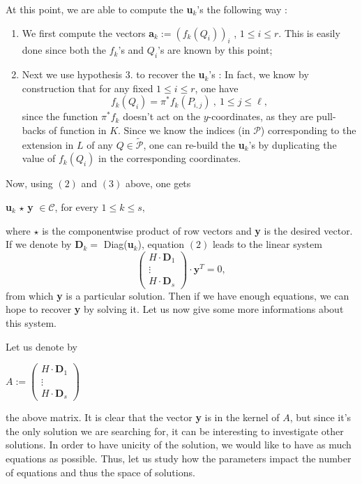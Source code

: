 \documentclass[10pt]{article}
\newcommand{\s}{\vspace{0.3cm}}
\newcommand{\cd}{\cdot}
\newcommand{\PR}{\mathcal{P}}
\begin{document}
At this point, we are able to compute the \textbf{u}$_{k}$'s the following way :
\begin{enumerate}
\item We first compute the vectors \textbf{a}$_{k} := (f_k(Q_i))_i$ , $1 \leq i \leq r$. This is easily done since both the $f_k$'s and $Q_i$'s are known by this point;
\item Next we use hypothesis $3.$ to recover the \textbf{u}$_{k}$'s : In fact, we know by construction that for any fixed $1 \leq i \leq r$, one have 
\[f_k(Q_i) = \pi^*f_k(P_{i,j}) \ , \ 1 \leq j \leq \ell,\]
since the function $\pi^*f_k$ doesn't act on the $y$-coordinates, as they are pull-backs of function in $K$. Since we know the indices (in $\PR$) corresponding to the extension in $L$ of any $Q \in \tilde{\PR}$, one can re-build the \textbf{u}$_{k}$'s by duplicating the value of $f_k(Q_i)$ in the corresponding coordinates.
\end{enumerate}

Now, using $(2)$ and $(3)$ above, one gets 
\begin{center}
\textbf{u}$_{k}$ $\star$ \textbf{y} $\in \mathcal{C}$, for every $1 \leq k \leq s,$
\end{center}
where $\star$ is the componentwise product of row vectors and \textbf{y} is the desired vector.
If we denote by \textbf{D}$_{k} = $ Diag(\textbf{u}$_{k}$), equation $(2)$ leads to the linear system 
\begin{equation}
\begin{pmatrix}
H \cd \textbf{D}_1 \\
\vdots \\
H \cd \textbf{D}_s
\end{pmatrix}
\cd \textbf{y}^T = 0, 
\end{equation}
from which \textbf{y} is a particular solution.
Then if we have enough equations, we can hope to recover \textbf{y} by solving it. Let us now give some more informations about this system.

\s

 Let us denote by
\begin{center}
$A := \begin{pmatrix}
H \cd \textbf{D}_1 \\
\vdots \\
H \cd \textbf{D}_s
\end{pmatrix}
$
\end{center}
the above matrix. It is clear that the vector \textbf{y} is in the kernel of $A$, but since it's the only solution we are searching for, it can be interesting to investigate other solutions. In order to have unicity of the solution, we would like to have as much equations as possible. Thus, let us study how the parameters impact the number of equations and thus the space of solutions.
\end{document}
